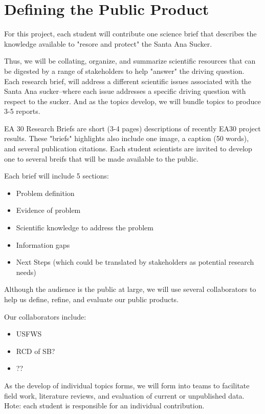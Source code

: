 \documentclass{article}\usepackage[]{graphicx}\usepackage[]{color}
\begin{document}
\section{Defining the Public Product}

For this project, each student will contribute one science brief that describes the knowledge available to "resore and protect" the Santa Ana Sucker. 

Thus, we will be collating, organize, and summarize scientific resources that can be digested by a range of stakeholders to help "answer" the driving question. Each research brief, will address a different scientific issues associated with the Santa Ana sucker--where each issue addresses a specific driving question with respect to the sucker. And as the topics develop, we will bundle topics to produce 3-5 reports.

EA 30 Research Briefs are short (3-4 pages) descriptions of recently EA30 project results. These "briefs" highlights also include one image, a caption (50 words), and several publication citations. Each student scientists are invited to develop one to several breifs that will be made available to the public.

Each brief will include 5 sections:

\begin{itemize}
  \item Problem definition
  \item Evidence of problem
  \item Scientific knowledge to address the problem
  \item Information gaps
  \item Next Steps (which could be translated by stakeholders as potential research needs)
\end{itemize}

Although the audience is the public at large, we will use several collaborators to help us define, refine, and evaluate our public products.  

Our collaborators include: 

\begin{itemize}
  \item USFWS
  \item RCD of SB?
  \item ??
\end{itemize}

As the develop of individual topics forms, we will form into teams to facilitate field work, literature reviews, and evaluation of current or unpublished data. Hote: each student is responsible for an individual contribution. 
\end{document}
